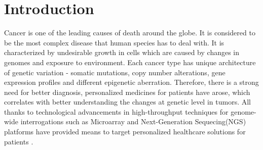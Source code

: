 %

\chapter{Introduction}
Cancer is one of the leading causes of death around the globe. It is considered to be the most complex disease that human species has to deal with. It is characterized by undesirable growth in cells which are caused by changes in genomes and exposure to environment\cite{5}. Each cancer type has unique architecture of genetic variation - somatic mutations, copy number alterations, gene expression profiles and different epigenetic aberration. Therefore, there is a strong need for better diagnosis, personalized medicines for patients have arose, which correlates with better understanding the changes at genetic level in tumors. All thanks to technological advancements in high-throughput techniques for genome-wide interrogations such as Microarray and Next-Generation Sequecing(NGS) platforms have provided means to target personalized healthcare solutions for patients\cite{stratton2009cancer} \cite{lengauer1998genetic}. \newline

